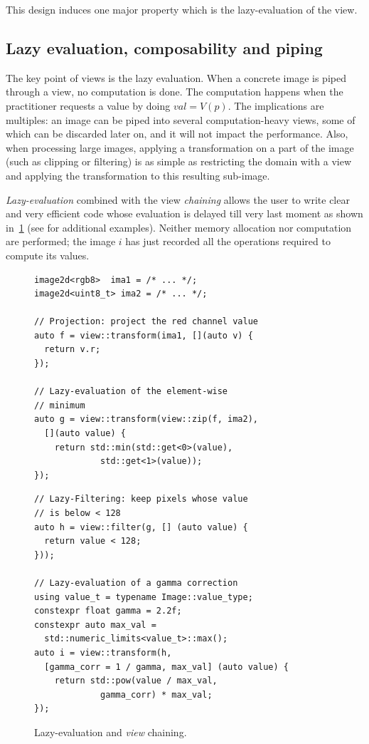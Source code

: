 This design induces one major property which is the lazy-evaluation of the view.

\subsection{Lazy evaluation, composability and piping}
\label{subsec:image.views.lazy.eval}

The key point of views is the lazy evaluation. When a concrete image is piped through a view, no computation is done.
The computation happens when the practitioner requests a value by doing $val = V(p)$. The implications are multiples: an
image can be piped into several computation-heavy views, some of which can be discarded later on, and it will not impact
the performance. Also, when processing large images, applying a transformation on a part of the image (such as clipping
or filtering) is as simple as restricting the domain with a view and applying the transformation to this resulting
sub-image.

\emph{Lazy-evaluation} combined with the view \emph{chaining} allows the user to write clear and very efficient code
whose evaluation is delayed till very last moment as shown in~\cref{fig.lazy} (see \cite{geraud.2018.gtgdmm} for
additional examples). Neither memory allocation nor computation are performed; the image $i$ has just recorded all the
operations required to compute its values.

\begin{figure}[htbp]
  \begin{minipage}[l]{0.48\linewidth}
    \begin{verbatim}
image2d<rgb8>  ima1 = /* ... */;
image2d<uint8_t> ima2 = /* ... */;

// Projection: project the red channel value
auto f = view::transform(ima1, [](auto v) {
  return v.r;
});

// Lazy-evaluation of the element-wise
// minimum
auto g = view::transform(view::zip(f, ima2),
  [](auto value) {
    return std::min(std::get<0>(value),
             std::get<1>(value));
});
\end{verbatim}
  \end{minipage}
  \hfill
  \begin{minipage}[l]{0.48\linewidth}
    \begin{verbatim}
// Lazy-Filtering: keep pixels whose value
// is below < 128
auto h = view::filter(g, [] (auto value) {
  return value < 128;
}));

// Lazy-evaluation of a gamma correction
using value_t = typename Image::value_type;
constexpr float gamma = 2.2f;
constexpr auto max_val =
  std::numeric_limits<value_t>::max();
auto i = view::transform(h,
  [gamma_corr = 1 / gamma, max_val] (auto value) {
    return std::pow(value / max_val,
             gamma_corr) * max_val;
});
\end{verbatim}
  \end{minipage}

  \caption{Lazy-evaluation and \emph{view} chaining.}
  \label{fig.lazy}
\end{figure}

